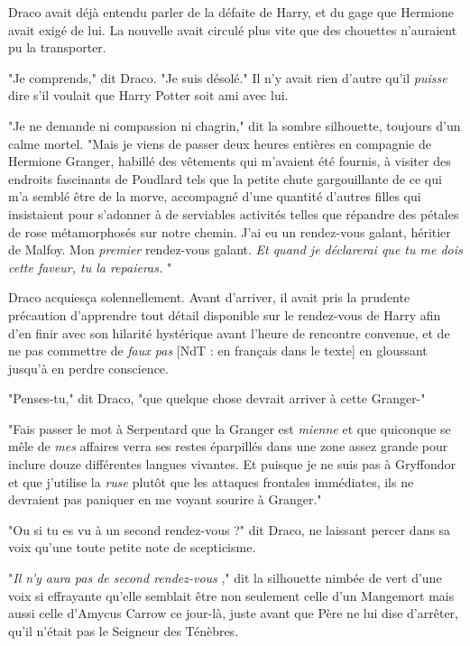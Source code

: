 Draco avait déjà entendu parler de la défaite de Harry, et du gage que Hermione avait exigé de lui. La nouvelle avait circulé plus vite que des chouettes n'auraient pu la transporter.

"Je comprends," dit Draco. "Je suis désolé." Il n'y avait rien d'autre qu'il \emph{puisse}  dire s'il voulait que Harry Potter soit ami avec lui.

"Je ne demande ni compassion ni chagrin," dit la sombre silhouette, toujours d'un calme mortel. "Mais je viens de passer deux heures entières en compagnie de Hermione Granger, habillé des vêtements qui m'avaient été fournis, à visiter des endroits fascinants de Poudlard tels que la petite chute gargouillante de ce qui m'a semblé être de la morve, accompagné d'une quantité d'autres filles qui insistaient pour s'adonner à de serviables activités telles que répandre des pétales de rose métamorphosés sur notre chemin. J'ai eu un rendez-vous galant, héritier de Malfoy. Mon \emph{premier}  rendez-vous galant. \emph{Et quand je déclarerai que tu me dois cette faveur, tu la repaieras.} "

Draco acquiesça solennellement. Avant d'arriver, il avait pris la prudente précaution d'apprendre tout détail disponible sur le rendez-vous de Harry afin d'en finir avec son hilarité hystérique avant l'heure de rencontre convenue, et de ne pas commettre de \emph{faux pas}  [NdT : en français dans le texte] en gloussant jusqu'à en perdre conscience.

"Penses-tu," dit Draco, "que quelque chose devrait arriver à cette Granger-"

"Fais passer le mot à Serpentard que la Granger est \emph{mienne}  et que quiconque se mêle de \emph{mes}  affaires verra ses restes éparpillés dans une zone assez grande pour inclure douze différentes langues vivantes. Et puisque je ne suis pas à Gryffondor et que j'utilise la \emph{ruse}  plutôt que les attaques frontales immédiates, ils ne devraient pas paniquer en me voyant sourire à Granger."

"Ou si tu es vu à un second rendez-vous ?" dit Draco, ne laissant percer dans sa voix qu'une toute petite note de scepticisme.

"\emph{Il n'y aura pas de second rendez-vous} ," dit la silhouette nimbée de vert d'une voix si effrayante qu'elle semblait être non seulement celle d'un Mangemort mais aussi celle d'Amycus Carrow ce jour-là, juste avant que Père ne lui dise d'arrêter, qu'il n'était pas le Seigneur des Ténèbres.


